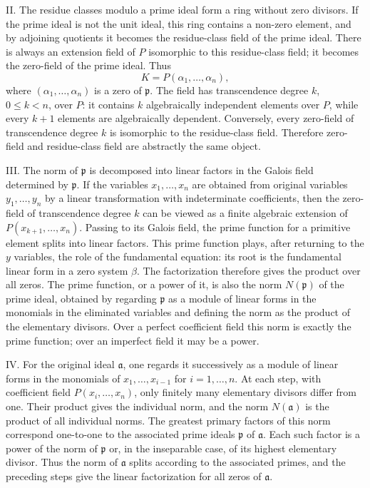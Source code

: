 \documentclass[11pt]{article}
\begin{document}
II. The residue classes modulo a prime ideal form a ring without zero divisors. If the prime ideal is not the unit ideal, this ring contains a non-zero element, and by adjoining quotients it becomes the residue-class field of the prime ideal. There is always an extension field of $P$ isomorphic to this residue-class field; it becomes the zero-field of the prime ideal. Thus
\[
  K=P(\alpha_1,\ldots,\alpha_n),
\]
where $(\alpha_1,\ldots,\alpha_n)$ is a zero of $\mathfrak p$. The field has transcendence degree $k$, $0\leq k<n$, over $P$: it contains $k$ algebraically independent elements over $P$, while every $k+1$ elements are algebraically dependent. Conversely, every zero-field of transcendence degree $k$ is isomorphic to the residue-class field. Therefore zero-field and residue-class field are abstractly the same object.

III. The norm of $\mathfrak p$ is decomposed into linear factors in the Galois field determined by $\mathfrak p$. If the variables $x_1,\ldots,x_n$ are obtained from original variables $y_1,\ldots,y_n$ by a linear transformation with indeterminate coefficients, then the zero-field of transcendence degree $k$ can be viewed as a finite algebraic extension of $P(x_{k+1},\ldots,x_n)$. Passing to its Galois field, the prime function for a primitive element splits into linear factors. This prime function plays, after returning to the $y$ variables, the role of the fundamental equation: its root is the fundamental linear form in a zero system $\beta$. The factorization therefore gives the product over all zeros. The prime function, or a power of it, is also the norm $N(\mathfrak p)$ of the prime ideal, obtained by regarding $\mathfrak p$ as a module of linear forms in the monomials in the eliminated variables and defining the norm as the product of the elementary divisors. Over a perfect coefficient field this norm is exactly the prime function; over an imperfect field it may be a power.

IV. For the original ideal $\mathfrak a$, one regards it successively as a module of linear forms in the monomials of $x_1,\ldots,x_{i-1}$ for $i=1,\ldots,n$. At each step, with coefficient field $P(x_i,
\ldots,x_n)$, only finitely many elementary divisors differ from one. Their product gives the individual norm, and the norm $N(\mathfrak a)$ is the product of all individual norms. The greatest primary factors of this norm correspond one-to-one to the associated prime ideals $\mathfrak p$ of $\mathfrak a$. Each such factor is a power of the norm of $\mathfrak p$ or, in the inseparable case, of its highest elementary divisor. Thus the norm of $\mathfrak a$ splits according to the associated primes, and the preceding steps give the linear factorization for all zeros of $\mathfrak a$.
\end{document}
